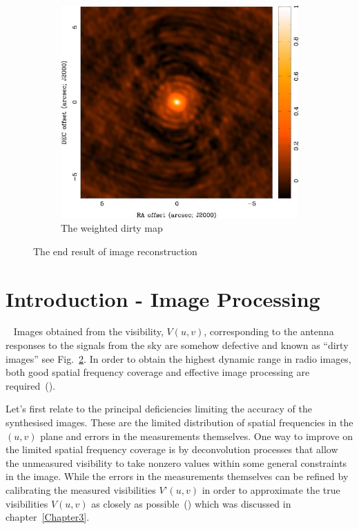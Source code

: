 \begin{figure}[h]
\begin{subfigure}[b]{0.5\textwidth}
                \includegraphics[width=\textwidth]{Figures/scaledbeam}
                \caption{The weighted dirty map}
                \label{fig:weightDirty}
        \end{subfigure}
        \caption[The end result of image reconstruction]{The end result of image reconstruction~\citep[Slide 51]{wilner.siw2014}}\label{fig:imageReconstruction}
\label{fig:Dirty}
\end{figure}
\section{Introduction - Image Processing}\
\label{sec:about4}
Images obtained from the visibility, $V(u,v)$, corresponding to the antenna responses to the signals from the sky are somehow defective and known as “dirty images” see Fig.~\ref{fig:Dirty}.  In order to obtain the highest dynamic range in radio images, both good spatial frequency coverage and effective image processing are required~(\citet[Pg.~426]{thompson2008interferometry}).

Let’s first relate to the principal deficiencies limiting the accuracy of the synthesised images. These are the limited distribution of spatial frequencies in the $(u,v)$ plane and errors in the measurements themselves. One way to improve on the limited spatial frequency coverage is by deconvolution processes that allow the unmeasured visibility to take nonzero values within some general constraints in the image. While the errors in the measurements themselves can be refined by calibrating the measured visibilities $V’(u,v)$ in order to approximate the true visibilities $V(u,v)$ as closely as possible~(\citet[Pg.~426]{thompson2008interferometry}) which was discussed in chapter~\ref{Chapter3}.

